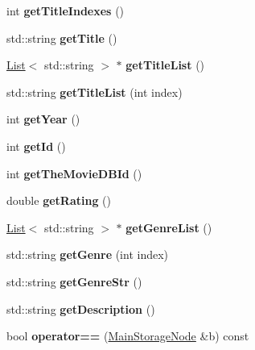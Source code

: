 \begin{DoxyCompactItemize}
\item 
\mbox{\label{class_main_storage_node_a7641874125fdb5a4ad61e68b0c24ef79}} 
int {\bfseries get\+Title\+Indexes} ()
\item 
\mbox{\label{class_main_storage_node_aa088226c953fce886abb5bbd67ede0be}} 
std\+::string {\bfseries get\+Title} ()
\item 
\mbox{\label{class_main_storage_node_a6853a9ca7d53d917c8114e7e285f4aa6}} 
\hyperlink{class_list}{List}$<$ std\+::string $>$ $\ast$ {\bfseries get\+Title\+List} ()
\item 
\mbox{\label{class_main_storage_node_a707940af6df89cf447a94d367eb8bfd4}} 
std\+::string {\bfseries get\+Title\+List} (int index)
\item 
\mbox{\label{class_main_storage_node_a82abc37501d50c8dd97cef8d4ea7a757}} 
int {\bfseries get\+Year} ()
\item 
\mbox{\label{class_main_storage_node_a66862b578eb91f0fccb2053834adadcc}} 
int {\bfseries get\+Id} ()
\item 
\mbox{\label{class_main_storage_node_a531efac856006fa9d1aa71f4d260b8c6}} 
int {\bfseries get\+The\+Movie\+D\+B\+Id} ()
\item 
\mbox{\label{class_main_storage_node_a1afeaa9e324a1c30bcc5b557ae1522ea}} 
double {\bfseries get\+Rating} ()
\item 
\mbox{\label{class_main_storage_node_a6e924c875275141c4dc6655b9e4ea903}} 
\hyperlink{class_list}{List}$<$ std\+::string $>$ $\ast$ {\bfseries get\+Genre\+List} ()
\item 
\mbox{\label{class_main_storage_node_a1e649dd7fb26b953e53e99eede379cbe}} 
std\+::string {\bfseries get\+Genre} (int index)
\item 
\mbox{\label{class_main_storage_node_acabd77af1b6abe4125ce751741897285}} 
std\+::string {\bfseries get\+Genre\+Str} ()
\item 
\mbox{\label{class_main_storage_node_ad4801522bb062f944d733e70109a8fcd}} 
std\+::string {\bfseries get\+Description} ()
\item 
\mbox{\label{class_main_storage_node_a39e87ddb55d1ab93172472667d7040fd}} 
bool {\bfseries operator==} (\hyperlink{class_main_storage_node}{Main\+Storage\+Node} \&b) const
\end{DoxyCompactItemize}
